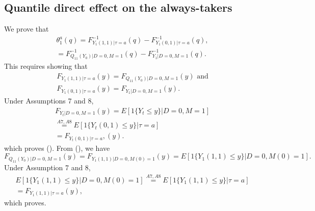 \documentclass[a4paper,12pt]{article}
\begin{document}
 \doublespacing \pagestyle{plain}
 \subsection{Quantile direct effect on the
always-takers}
We prove that
\begin{align*}
\theta_1^a (q) = F_{Y_1(1,1)|\tau=a}^{-1}(q)- F_{Y_1(0,1)|\tau=a}^{-1}(q), \\
= F_{Q_{11}(Y_0)|D=0,M=1}^{-1}(q)-F_{Y_1|D=0,M=1}^{-1}(q).
\end{align*}
This requires showing that
\begin{align}
F_{Y_1(1,1)|\tau=a}(y) =F_{Q_{11}(Y_0)|D=0,M=1}(y) \mbox{ and} \\
F_{Y_1(0,1)|\tau=a}(y)  = F_{Y_1|D=0,M=1}(y). 
\end{align}
Under Assumptions 7 and 8,
\begin{equation} 
\begin{array}{rl}
F_{Y_t|D=0,M=1} (y) = E[1\{Y_t\leq y\}|D=0,M=1] \\ \stackrel{A7,A8}{=}E[1\{Y_t(0,1)\leq y\}|\tau=a] \\ = F_{Y_{t}(0,1)|\tau=a}, (y). \end{array}
\end{equation}
which proves (). From (), we have
\begin{equation*}
F_{Q_{11}(Y_{0})|D=0,M=1}(y) = F_{Y_{1}(1,1)|D=0,M(0)=1}(y)=E[1\{Y_1(1,1) \leq y\}|D=0,M(0)=1].
\end{equation*}
Under Assumption 7 and 8,
\begin{equation}  \begin{array}{rl} E[1\{Y_1(1,1) \leq y\}|D=0,M(0)=1]\stackrel{A7,A8}{=}E[1\{Y_1(1,1) \leq y\}|\tau=a]\\  = F_{Y_1(1,1)|\tau=a}(y),
\end{array} \end{equation}
which proves.
\end{document}
